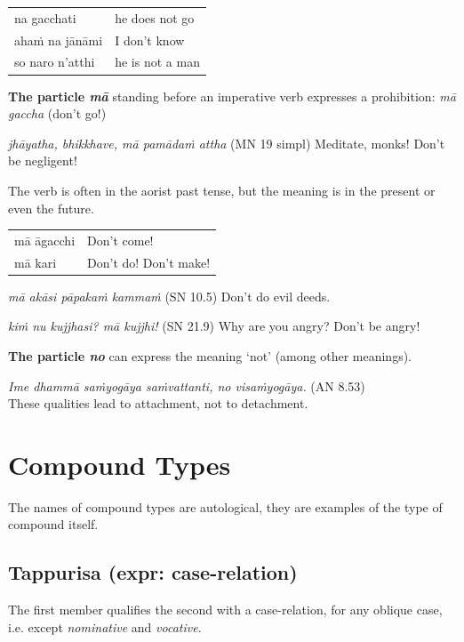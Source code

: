 \documentclass[11pt,oneside]{memoir}
\begin{document}
\begin{center}
\begin{tabular}{ll}
na gacchati & he does not go\\
ahaṁ na jānāmi & I don't know\\
so naro n'atthi & he is not a man\\
\end{tabular}
\end{center}

\textbf{The particle \emph{mā}} standing before an imperative verb expresses a prohibition: \emph{mā gaccha} (don't go!)

\emph{jhāyatha, bhikkhave, mā pamādaṁ attha} (MN 19 simpl) Meditate, monks! Don’t be negligent!

The verb is often in the aorist past tense, but the meaning is in the present or even the future.

\begin{center}
\begin{tabular}{ll}
mā āgacchi & Don't come!\\
mā kari & Don't do! Don't make!\\
\end{tabular}
\end{center}

\emph{mā akāsi pāpakaṁ kammaṁ} (SN 10.5) Don’t do evil deeds.

\emph{kiṁ nu kujjhasi? mā kujjhi!} (SN 21.9) Why are you angry? Don't be angry!

\textbf{The particle \emph{no}} can express the meaning `not' (among other meanings).

\emph{Ime dhammā saṁyogāya saṁvattanti, no visaṁyogāya.} (AN 8.53) \\
These qualities lead to attachment, not to detachment.

\clearpage
\section{Compound Types}
\label{sec:orgd1064ce}

\label{compound-types}

The names of compound types are autological, they are examples of the type of compound itself.
\subsection{Tappurisa (expr: case-relation)}
\label{sec:org479eb05}

The first member qualifies the second with a case-relation, for any oblique case, i.e. except \emph{nominative} and \emph{vocative}.
\end{document}
